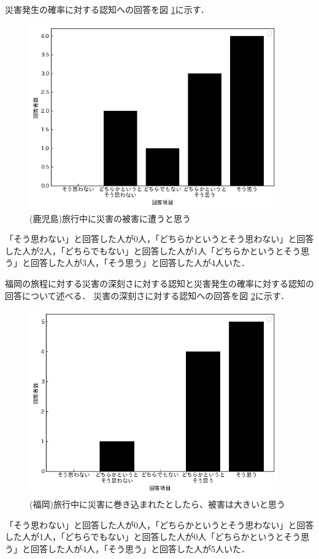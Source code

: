 災害発生の確率に対する認知への回答を図 \ref{fig:system_kagoshima_2}に示す．
\begin{figure}[H]
  \centering
  \includegraphics[height=8cm]{./fig/system_kagoshima_2.png}
  \caption{(鹿児島)旅行中に災害の被害に遭うと思う}
  \label{fig:system_kagoshima_2}
\end{figure}
「そう思わない」と回答した人が0人，「どちらかというとそう思わない」と回答した人が2人，「どちらでもない」と回答した人が1人「どちらかというとそう思う」と回答した人が3人，「そう思う」と回答した人が4人いた．

福岡の旅程に対する災害の深刻さに対する認知と災害発生の確率に対する認知の回答について述べる．
災害の深刻さに対する認知への回答を図 \ref{fig:system_fukuoka_1}に示す．
\begin{figure}[H]
  \centering
  \includegraphics[height=8cm]{./fig/system_fukuoka_1.png}
  \caption{(福岡)旅行中に災害に巻き込まれたとしたら、被害は大きいと思う}
  \label{fig:system_fukuoka_1}
\end{figure}
「そう思わない」と回答した人が0人，「どちらかというとそう思わない」と回答した人が1人，「どちらでもない」と回答した人が0人「どちらかというとそう思う」と回答した人が4人，「そう思う」と回答した人が5人いた．

